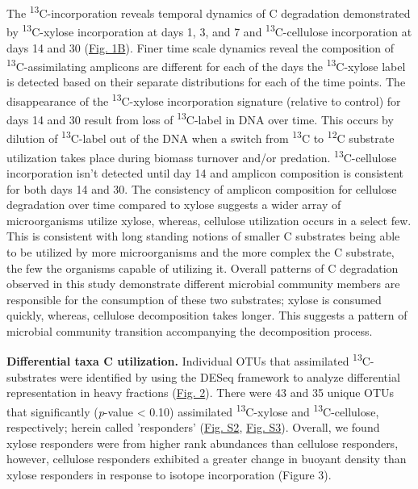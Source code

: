 The \textsuperscript{13}C-incorporation reveals temporal dynamics of C degradation demonstrated by \textsuperscript{13}C-xylose incorporation at days 1, 3, and 7 and \textsuperscript{13}C-cellulose incorporation at days 14 and 30 (\href{https://www.authorea.com/users/3537/articles/3612/master/file/figures/ordination_all1/ordination_all1.png}{Fig. 1B}). Finer time scale dynamics reveal the composition of \textsuperscript{13}C-assimilating amplicons are different for each of the days the \textsuperscript{13}C-xylose label is detected based on their separate distributions for each of the time points. The disappearance of the \textsuperscript{13}C-xylose incorporation signature (relative to control) for days 14 and 30 result from loss of \textsuperscript{13}C-label in DNA over time. This occurs by dilution of \textsuperscript{13}C-label out of the DNA when a switch from \textsuperscript{13}C to \textsuperscript{12}C substrate utilization takes place during biomass turnover and/or predation. \textsuperscript{13}C-cellulose incorporation isn't detected until day 14 and amplicon composition is consistent for both days 14 and 30.  The consistency of amplicon composition for cellulose degradation over time compared to xylose suggests a wider array of microorganisms utilize xylose, whereas, cellulose utilization occurs in a select few.  This is consistent with long standing notions of smaller C substrates being able to be utilized by more microorganisms and the more complex the C substrate, the few the organisms capable of utilizing it. Overall patterns of C degradation observed in this study demonstrate different microbial community members are responsible for the consumption of these two substrates; xylose is consumed quickly, whereas, cellulose decomposition takes longer. This suggests a pattern of microbial community transition accompanying the decomposition process. 





\textbf{Differential taxa C utilization.} Individual OTUs that assimilated \textsuperscript{13}C-substrates were identified by using the DESeq framework \cite{Anders_Huber_2010} to analyze differential representation in heavy fractions (\href{https://www.authorea.com/users/3537/articles/3612/master/file/figures/l2fc_fig1/l2fc_fig.pdf}{Fig. 2}). There were 43 and 35 unique OTUs that significantly (\textit{p}-value < 0.10) assimilated \textsuperscript{13}C-xylose and \textsuperscript{13}C-cellulose, respectively; herein called 'responders' (\href{https://www.authorea.com/users/3537/articles/8459/master/file/figures/OTU_screening_schematic/OTU_screening_schematic.pdf}{Fig. S2}, \href{https://www.authorea.com/users/3537/articles/8459/master/file/figures/l2fc_fig_pVal/l2fc_fig_pVal.png}{Fig. S3}). Overall, we found xylose responders were from higher rank abundances than cellulose responders, however, cellulose responders exhibited a greater change in buoyant density than xylose responders in response to isotope incorporation (Figure 3). 

